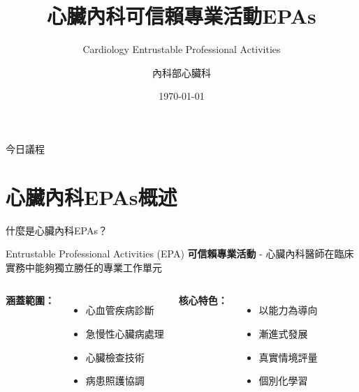 \documentclass[aspectratio=169]{beamer}
\title{心臟內科可信賴專業活動EPAs}
\subtitle{Cardiology Entrustable Professional Activities}
\author{內科部心臟科}
\date{\today}
\institute{醫學中心}
\begin{document}
\begin{frame}
\titlepage
\end{frame}

\begin{frame}{今日議程}
\tableofcontents
\end{frame}

\section{心臟內科EPAs概述}

\begin{frame}{什麼是心臟內科EPAs？}
\begin{block}{Entrustable Professional Activities (EPA)}
\textbf{可信賴專業活動} - 心臟內科醫師在臨床實務中能夠獨立勝任的專業工作單元
\end{block}

\vspace{0.5cm}

\begin{columns}[c]
\textbf{涵蓋範圍：}
\begin{itemize}
\item 心血管疾病診斷
\item 急慢性心臟病處理
\item 心臟檢查技術
\item 病患照護協調
\end{itemize}

\textbf{核心特色：}
\begin{itemize}
\item 以能力為導向
\item 漸進式發展
\item 真實情境評量
\item 個別化學習
\end{itemize}
\end{columns}
\end{frame}
\end{document}
